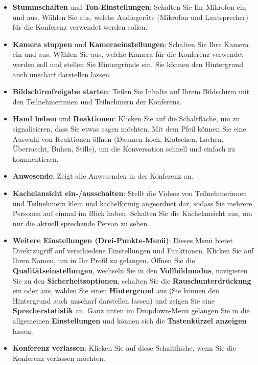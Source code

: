 \documentclass[
  letterpaper,
  DIV=11,
  numbers=noendperiod]{scrreprt}
\providecommand{\tightlist}{%
  \setlength{\itemsep}{0pt}\setlength{\parskip}{0pt}}\usepackage{longtable,booktabs,array}
\begin{document}
\begin{itemize}
\tightlist
\item
  \textbf{Stummschalten} und \textbf{Ton-Einstellungen}: Schalten Sie
  Ihr Mikrofon ein und aus. Wählen Sie aus, welche Audiogeräte (Mikrofon
  und Lautsprecher) für die Konferenz verwendet werden sollen.
\item
  \textbf{Kamera stoppen} und \textbf{Kameraeinstellungen}: Schalten Sie
  Ihre Kamera ein und aus. Wählen Sie aus, welche Kamera für die
  Konferenz verwendet werden soll und stellen Sie Hintergründe ein. Sie
  können den Hintergrund auch unscharf darstellen lassen.
\item
  \textbf{Bildschirmfreigabe starten}: Teilen Sie Inhalte auf Ihrem
  Bildschirm mit den Teilnehmerinnen und Teilnehmern der Konferenz.
\item
  \textbf{Hand heben} und \textbf{Reaktionen}: Klicken Sie auf die
  Schaltfläche, um zu signalisieren, dass Sie etwas sagen möchten. Mit
  dem Pfeil können Sie eine Auswahl von Reaktionen öffnen (Daumen hoch,
  Klatschen, Lachen, Überrascht, Buhen, Stille), um die Konversation
  schnell und einfach zu kommentieren.
\item
  \textbf{Anwesende}: Zeigt alle Anwesenden in der Konferenz an.
\item
  \textbf{Kachelansicht ein-/ausschalten}: Stellt die Videos von
  Teilnehmerinnen und Teilnehmern klein und kachelförmig angeordnet dar,
  sodass Sie mehrere Personen auf einmal im Blick haben. Schalten Sie
  die Kachelansicht aus, um nur die aktuell sprechende Person zu sehen.
\item
  \textbf{Weitere Einstellungen (Drei-Punkte-Menü)}: Dieses Menü bietet
  Direktzugriff auf verschiedene Einstellungen und Funktionen. Klicken
  Sie auf Ihren Namen, um in Ihr Profil zu gelangen. Öffnen Sie die
  \textbf{Qualitätseinstellungen}, wechseln Sie in den
  \textbf{Vollbildmodus}, navigieren Sie zu den
  \textbf{Sicherheitsoptionen}, schalten Sie die
  \textbf{Rauschunterdrückung} ein oder aus, wählen Sie einen
  \textbf{Hintergrund} aus (Sie können den Hintergrund auch unscharf
  darstellen lassen) und zeigen Sie eine \textbf{Sprecherstatistik} an.
  Ganz unten im Dropdown-Menü gelangen Sie in die allgemeinen
  \textbf{Einstellungen} und können sich die \textbf{Tastenkürzel
  anzeigen} lassen.
\item
  \textbf{Konferenz verlassen}: Klicken Sie auf diese Schaltfläche, wenn
  Sie die Konferenz verlassen möchten.
\end{itemize}
\end{document}

